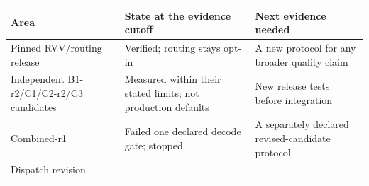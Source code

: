 \documentclass[10pt,a4paper]{article}
\begin{document}
\begin{longtable}[]{@{}lll@{}}
\toprule
\begin{minipage}[b]{0.30\columnwidth}\raggedright
Area\strut
\end{minipage} & \begin{minipage}[b]{0.30\columnwidth}\raggedright
State at the evidence cutoff\strut
\end{minipage} & \begin{minipage}[b]{0.30\columnwidth}\raggedright
Next evidence needed\strut
\end{minipage}\tabularnewline
\midrule
\endhead
\begin{minipage}[t]{0.30\columnwidth}\raggedright
Pinned RVV/routing release\strut
\end{minipage} & \begin{minipage}[t]{0.30\columnwidth}\raggedright
Verified; routing stays opt-in\strut
\end{minipage} & \begin{minipage}[t]{0.30\columnwidth}\raggedright
A new protocol for any broader quality claim\strut
\end{minipage}\tabularnewline
\begin{minipage}[t]{0.30\columnwidth}\raggedright
Independent B1-r2/C1/C2-r2/C3 candidates\strut
\end{minipage} & \begin{minipage}[t]{0.30\columnwidth}\raggedright
Measured within their stated limits; not production defaults\strut
\end{minipage} & \begin{minipage}[t]{0.30\columnwidth}\raggedright
New release tests before integration\strut
\end{minipage}\tabularnewline
\begin{minipage}[t]{0.30\columnwidth}\raggedright
Combined-r1\strut
\end{minipage} & \begin{minipage}[t]{0.30\columnwidth}\raggedright
Failed one declared decode gate; stopped\strut
\end{minipage} & \begin{minipage}[t]{0.30\columnwidth}\raggedright
A separately declared revised-candidate protocol\strut
\end{minipage}\tabularnewline
\begin{minipage}[t]{0.30\columnwidth}\raggedright
Dispatch revision\strut
\end{minipage} & \begin{minipage}[t]{0.30\columnwidth}\raggedright

\end{minipage}
\end{longtable}
\end{document}

